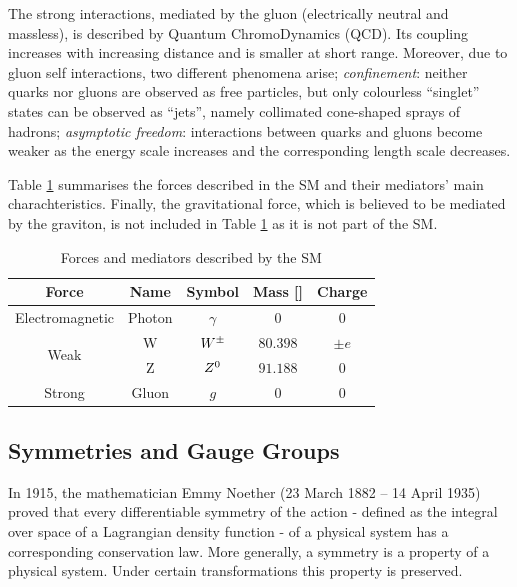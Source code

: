 			The strong interactions, mediated by the gluon (electrically neutral and massless), is described by Quantum ChromoDynamics (QCD). Its coupling increases with increasing distance and is smaller at short range. Moreover, due to gluon self interactions, two different phenomena arise; \emph{confinement}: neither quarks nor gluons are observed as free particles, but only colourless “singlet” states can be observed as “jets”, namely collimated cone-shaped sprays of hadrons; \emph{asymptotic freedom}: interactions between quarks and gluons become weaker as the energy scale increases and the corresponding length scale decreases.

			Table \ref{tab:interactions} summarises the forces described in the SM and their mediators' main charachteristics. Finally, the gravitational force, which is believed to be mediated by the graviton, is not included in Table \ref{tab:interactions} as it is not part of the SM.

			\begin{table}[!htb]\centering\caption{Forces and mediators described by the SM}							
				\begin{tabular}{c|c|c|c|c}
					\hline \hline
					Force & Name & Symbol & Mass [\GeV]& Charge \\ \hline \hline
					Electromagnetic & Photon & $\gamma$ & 0 & 0 \\ \hline
					\multirow{2}{*}{Weak} & W & $W^{\pm}$ & $80.398$ & $\pm e$ \\
					& Z & $Z^0$ & $91.188$ & 0 \\\hline
					Strong & Gluon & $g$ & $0$ & $0$ \\\hline\hline
				\end{tabular}						
			\label{tab:interactions} 
			\end{table}



		\subsection*{Symmetries and Gauge Groups}

			In 1915, the mathematician Emmy Noether (23 March 1882 – 14 April 1935) proved that every differentiable symmetry of the action - defined as the integral over space of a Lagrangian density function - of a physical system has a corresponding conservation law. More generally, a symmetry is a property of a physical system. Under certain transformations this property is preserved. 


